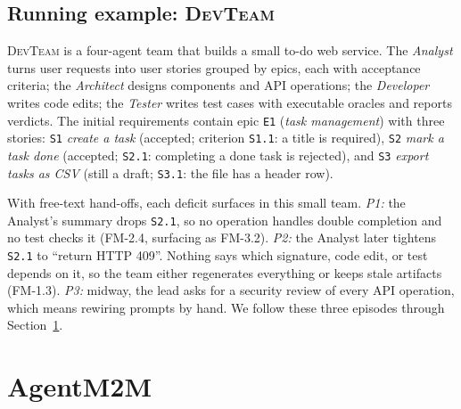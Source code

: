 \documentclass[10pt,conference]{IEEEtran}
\theoremstyle{definition}
\newcommand{\devteam}{\textsc{DevTeam}}
\newcommand{\code}[1]{\texttt{#1}}
\begin{document}
\subsection{Running example: \devteam{}}

\devteam{} is a four-agent team that builds a small to-do web service. The
\emph{Analyst} turns user requests into user stories grouped by epics, each
with acceptance criteria; the \emph{Architect} designs components and API
operations; the \emph{Developer} writes code edits; the \emph{Tester}
writes test cases with executable oracles and reports verdicts. The initial
requirements contain epic \code{E1} (\emph{task management}) with three
stories: \code{S1} \emph{create a task} (accepted; criterion \code{S1.1}: a
title is required), \code{S2} \emph{mark a task done} (accepted;
\code{S2.1}: completing a done task is rejected), and \code{S3}
\emph{export tasks as CSV} (still a draft; \code{S3.1}: the file has a
header row).

With free-text hand-offs, each deficit surfaces in this small team.
\emph{P1:} the Analyst's summary drops \code{S2.1}, so no operation handles
double completion and no test checks it (FM-2.4, surfacing as FM-3.2).
\emph{P2:} the Analyst later tightens \code{S2.1} to ``return HTTP 409''.
Nothing says which signature, code edit, or test depends on it, so the team
either regenerates everything or keeps stale artifacts (FM-1.3). \emph{P3:}
midway, the lead asks for a security review of every API operation, which
means rewiring prompts by hand. We follow these three episodes
through Section~\ref{sec:approach}.

\section{AgentM2M}\label{sec:approach}
\end{document}
